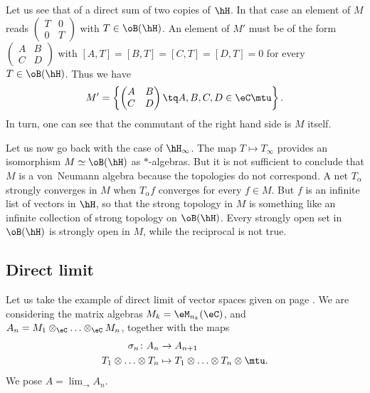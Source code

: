 Let us see that of a direct sum of two copies of $\hH$. In that case an element of $M$ reads 
$\begin{pmatrix}
T&0\\
0&T
\end{pmatrix}$ with $T\in\oB(\hH)$. An element of $M'$ must be of the form 
$\begin{pmatrix}
A&B\\
C&D
\end{pmatrix}$ with $[A,T]=[B,T]=[C,T]=[D,T]=0$ for every $T\in\oB(\hH)$. Thus we have
\begin{equation}
M'=\left\{ \begin{pmatrix}
A&B\\
C&D
\end{pmatrix}\tq A,B,C,D\in\eC\mtu \right\}.
\end{equation}
In turn, one can see that the commutant of the right hand side is $M$ itself.

Let us now go back with the case of $\hH_{\infty}$. The map $T\mapsto T_{\infty}$ provides an isomorphism $M\simeq\oB(\hH)$ as $*$-algebras. But it is not sufficient to conclude that $M$ is a von~Neumann algebra because the topologies do not correspond. A net $T_{\alpha}$ strongly converges in $M$ when $T_{\alpha}f$ converges for every $f\in M$. But $f$ is an infinite list of vectors in $\hH$, so that the strong topology in $M$ is something like an infinite collection of strong topology on $\oB(\hH)$. Every strongly open set in $\oB(\hH)$ is strongly open in $M$, while the reciprocal is not true.

\subsection{Direct limit}

Let us take the example of direct limit of vector spaces given on page \pageref{PgExDirectLimVS}. We are considering the matrix algebras $M_k=\eM_{n_k}(\eC)$, and $A_n=M_1\otimes_{\eC}\ldots\otimes_{\eC} M_n$, together with the maps
\begin{equation}
\begin{aligned}
 \sigma_n\colon A_n&\to A_{n+1} \\ 
   T_1\otimes\ldots\otimes T_n&\mapsto T_1\otimes \ldots\otimes T_n\otimes \mtu. 
\end{aligned}
\end{equation}
We pose $A=\lim_{\rightarrow}A_n$.

